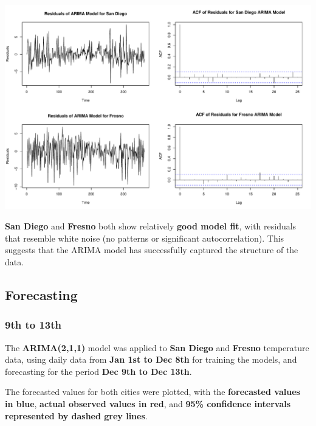 \documentclass[
  11pt,
]{article}
\begin{document}
\includegraphics{project_files/figure-pdf/unnamed-chunk-89-1.pdf}

\textbf{San Diego} and \textbf{Fresno} both show relatively \textbf{good
model fit}, with residuals that resemble white noise (no patterns or
significant autocorrelation). This suggests that the ARIMA model has
successfully captured the structure of the data.

\subsection{Forecasting}\label{forecasting}

\subsubsection{9th to 13th}\label{th-to-13th}

The \textbf{ARIMA(2,1,1)} model was applied to \textbf{San Diego} and
\textbf{Fresno} temperature data, using daily data from \textbf{Jan 1st
to Dec 8th} for training the models, and forecasting for the period
\textbf{Dec 9th to Dec 13th}.

The forecasted values for both cities were plotted, with the
\textbf{forecasted values in blue}, \textbf{actual observed values in
red}, and \textbf{95\% confidence intervals represented by dashed grey
lines}.
\end{document}
